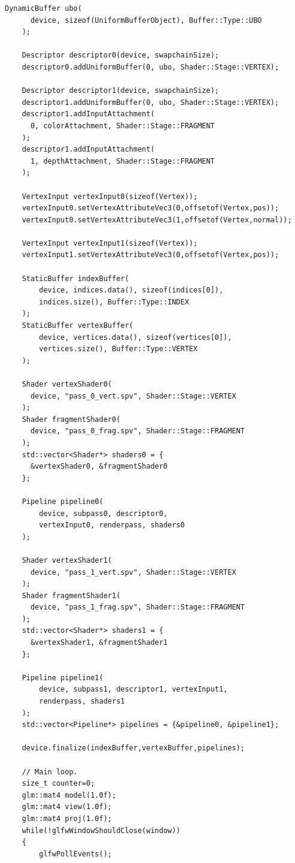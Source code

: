 \documentclass[12pt]{report}
\theoremstyle{definition}
\begin{document}
\begin{lstlisting}[caption=Multipass drawing with evulkan library., showstringspaces=false]
    DynamicBuffer ubo(
      device, sizeof(UniformBufferObject), Buffer::Type::UBO
    );

    Descriptor descriptor0(device, swapchainSize);
    descriptor0.addUniformBuffer(0, ubo, Shader::Stage::VERTEX);

    Descriptor descriptor1(device, swapchainSize);
    descriptor1.addUniformBuffer(0, ubo, Shader::Stage::VERTEX);
    descriptor1.addInputAttachment(
      0, colorAttachment, Shader::Stage::FRAGMENT
    );
    descriptor1.addInputAttachment(
      1, depthAttachment, Shader::Stage::FRAGMENT
    );

    VertexInput vertexInput0(sizeof(Vertex));
    vertexInput0.setVertexAttributeVec3(0,offsetof(Vertex,pos));
    vertexInput0.setVertexAttributeVec3(1,offsetof(Vertex,normal));

    VertexInput vertexInput1(sizeof(Vertex));
    vertexInput1.setVertexAttributeVec3(0,offsetof(Vertex,pos));

    StaticBuffer indexBuffer(
        device, indices.data(), sizeof(indices[0]),
        indices.size(), Buffer::Type::INDEX
    );
    StaticBuffer vertexBuffer(
        device, vertices.data(), sizeof(vertices[0]),
        vertices.size(), Buffer::Type::VERTEX
    );

    Shader vertexShader0(
      device, "pass_0_vert.spv", Shader::Stage::VERTEX
    );
    Shader fragmentShader0(
      device, "pass_0_frag.spv", Shader::Stage::FRAGMENT
    );
    std::vector<Shader*> shaders0 = {
      &vertexShader0, &fragmentShader0
    };

    Pipeline pipeline0(
        device, subpass0, descriptor0,
        vertexInput0, renderpass, shaders0
    );

    Shader vertexShader1(
      device, "pass_1_vert.spv", Shader::Stage::VERTEX
    );
    Shader fragmentShader1(
      device, "pass_1_frag.spv", Shader::Stage::FRAGMENT
    );
    std::vector<Shader*> shaders1 = {
      &vertexShader1, &fragmentShader1
    };

    Pipeline pipeline1(
        device, subpass1, descriptor1, vertexInput1,
        renderpass, shaders1
    );
    std::vector<Pipeline*> pipelines = {&pipeline0, &pipeline1};

    device.finalize(indexBuffer,vertexBuffer,pipelines);

    // Main loop.
    size_t counter=0;
    glm::mat4 model(1.0f);
    glm::mat4 view(1.0f);
    glm::mat4 proj(1.0f);
    while(!glfwWindowShouldClose(window))
    {
        glfwPollEvents();


\end{lstlisting}
\end{document}
